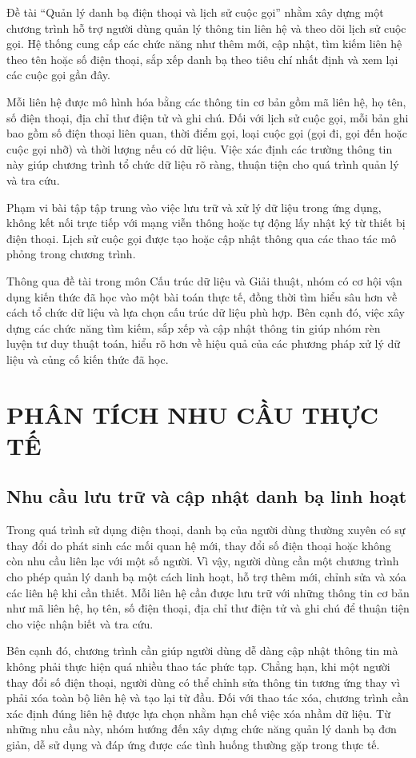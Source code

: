 \documentclass[12pt,a4paper]{report}
\begin{document}
Đề tài “Quản lý danh bạ điện thoại và lịch sử cuộc gọi” nhằm xây dựng một chương trình hỗ trợ người dùng quản lý thông tin liên hệ và theo dõi lịch sử cuộc gọi. Hệ thống cung cấp các chức năng như thêm mới, cập nhật, tìm kiếm liên hệ theo tên hoặc số điện thoại, sắp xếp danh bạ theo tiêu chí nhất định và xem lại các cuộc gọi gần đây.\par
Mỗi liên hệ được mô hình hóa bằng các thông tin cơ bản gồm mã liên hệ, họ tên, số điện thoại, địa chỉ thư điện tử và ghi chú. Đối với lịch sử cuộc gọi, mỗi bản ghi bao gồm số điện thoại liên quan, thời điểm gọi, loại cuộc gọi (gọi đi, gọi đến hoặc cuộc gọi nhỡ) và thời lượng nếu có dữ liệu. Việc xác định các trường thông tin này giúp chương trình tổ chức dữ liệu rõ ràng, thuận tiện cho quá trình quản lý và tra cứu.\par
Phạm vi bài tập tập trung vào việc lưu trữ và xử lý dữ liệu trong ứng dụng, không kết nối trực tiếp với mạng viễn thông hoặc tự động lấy nhật ký từ thiết bị điện thoại. Lịch sử cuộc gọi được tạo hoặc cập nhật thông qua các thao tác mô phỏng trong chương trình.\par
Thông qua đề tài trong môn Cấu trúc dữ liệu và Giải thuật, nhóm có cơ hội vận dụng kiến thức đã học vào một bài toán thực tế, đồng thời tìm hiểu sâu hơn về cách tổ chức dữ liệu và lựa chọn cấu trúc dữ liệu phù hợp. Bên cạnh đó, việc xây dựng các chức năng tìm kiếm, sắp xếp và cập nhật thông tin giúp nhóm rèn luyện tư duy thuật toán, hiểu rõ hơn về hiệu quả của các phương pháp xử lý dữ liệu và củng cố kiến thức đã học.\par
\section{PHÂN TÍCH NHU CẦU THỰC TẾ}

\subsection{Nhu cầu lưu trữ và cập nhật danh bạ linh hoạt}

Trong quá trình sử dụng điện thoại, danh bạ của người dùng thường xuyên có sự thay đổi do phát sinh các mối quan hệ mới, thay đổi số điện thoại hoặc không còn nhu cầu liên lạc với một số người. Vì vậy, người dùng cần một chương trình cho phép quản lý danh bạ một cách linh hoạt, hỗ trợ thêm mới, chỉnh sửa và xóa các liên hệ khi cần thiết. Mỗi liên hệ cần được lưu trữ với những thông tin cơ bản như mã liên hệ, họ tên, số điện thoại, địa chỉ thư điện tử và ghi chú để thuận tiện cho việc nhận biết và tra cứu.\par
Bên cạnh đó, chương trình cần giúp người dùng dễ dàng cập nhật thông tin mà không phải thực hiện quá nhiều thao tác phức tạp. Chẳng hạn, khi một người thay đổi số điện thoại, người dùng có thể chỉnh sửa thông tin tương ứng thay vì phải xóa toàn bộ liên hệ và tạo lại từ đầu. Đối với thao tác xóa, chương trình cần xác định đúng liên hệ được lựa chọn nhằm hạn chế việc xóa nhầm dữ liệu. Từ những nhu cầu này, nhóm hướng đến xây dựng chức năng quản lý danh bạ đơn giản, dễ sử dụng và đáp ứng được các tình huống thường gặp trong thực tế.\par
\end{document}
